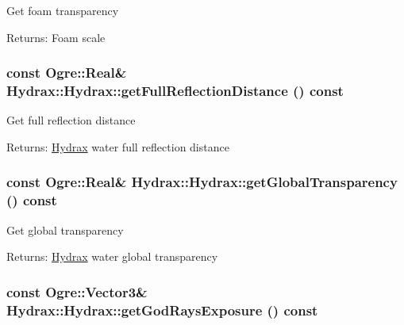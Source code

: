 Get foam transparency \begin{Desc}
\item[Returns:]Foam scale \end{Desc}
\hypertarget{class_hydrax_1_1_hydrax_ac55c7b84c7d6e067010526a91d1ee00}{
\subsubsection[{getFullReflectionDistance}]{\setlength{\rightskip}{0pt plus 5cm}const Ogre::Real\& Hydrax::Hydrax::getFullReflectionDistance () const}}
\label{class_hydrax_1_1_hydrax_ac55c7b84c7d6e067010526a91d1ee00}


Get full reflection distance \begin{Desc}
\item[Returns:]\hyperlink{class_hydrax_1_1_hydrax}{Hydrax} water full reflection distance \end{Desc}
\hypertarget{class_hydrax_1_1_hydrax_9f71ca1190dd56802a9a0d5e6fe7b73d}{
\subsubsection[{getGlobalTransparency}]{\setlength{\rightskip}{0pt plus 5cm}const Ogre::Real\& Hydrax::Hydrax::getGlobalTransparency () const}}
\label{class_hydrax_1_1_hydrax_9f71ca1190dd56802a9a0d5e6fe7b73d}


Get global transparency \begin{Desc}
\item[Returns:]\hyperlink{class_hydrax_1_1_hydrax}{Hydrax} water global transparency \end{Desc}
\hypertarget{class_hydrax_1_1_hydrax_562ddb88c1218f3eecc5889efb2ff7f3}{
\subsubsection[{getGodRaysExposure}]{\setlength{\rightskip}{0pt plus 5cm}const Ogre::Vector3\& Hydrax::Hydrax::getGodRaysExposure () const}}
\label{class_hydrax_1_1_hydrax_562ddb88c1218f3eecc5889efb2ff7f3}


